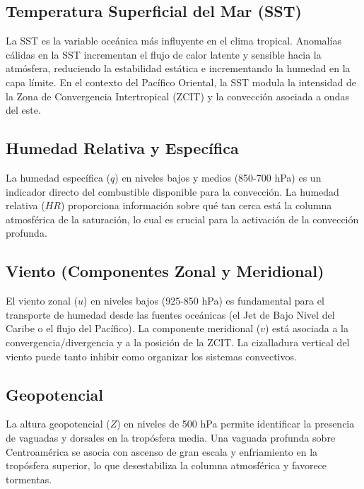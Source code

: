 \documentclass[titlepage,11pt]{report}
\begin{document}
\subsection{Temperatura Superficial del Mar (SST)}
La SST es la variable oceánica más influyente en el clima tropical. Anomalías cálidas en la SST incrementan el flujo de calor latente y sensible hacia la atmósfera, reduciendo la estabilidad estática e incrementando la humedad en la capa límite. En el contexto del Pacífico Oriental, la SST modula la intensidad de la Zona de Convergencia Intertropical (ZCIT) y la convección asociada a ondas del este.

\subsection{Humedad Relativa y Específica}
La humedad específica (\(q\)) en niveles bajos y medios (850-700 hPa) es un indicador directo del combustible disponible para la convección. La humedad relativa (\(HR\)) proporciona información sobre qué tan cerca está la columna atmosférica de la saturación, lo cual es crucial para la activación de la convección profunda.

\subsection{Viento (Componentes Zonal y Meridional)}
El viento zonal (\(u\)) en niveles bajos (925-850 hPa) es fundamental para el transporte de humedad desde las fuentes oceánicas (el Jet de Bajo Nivel del Caribe o el flujo del Pacífico). La componente meridional (\(v\)) está asociada a la convergencia/divergencia y a la posición de la ZCIT. La cizalladura vertical del viento puede tanto inhibir como organizar los sistemas convectivos.

\subsection{Geopotencial}
La altura geopotencial (\(Z\)) en niveles de 500 hPa permite identificar la presencia de vaguadas y dorsales en la tropósfera media. Una vaguada profunda sobre Centroamérica se asocia con ascenso de gran escala y enfriamiento en la tropósfera superior, lo que desestabiliza la columna atmosférica y favorece tormentas.
\end{document}

